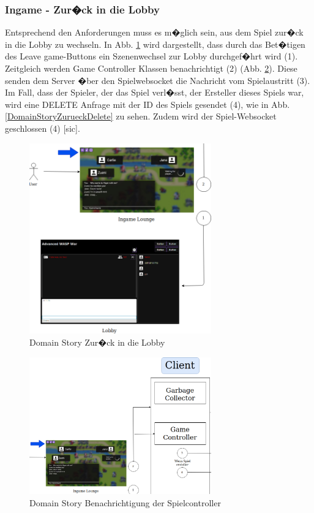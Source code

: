 \documentclass[12pt, titlepage]{scrartcl}
\begin{document}
		\subsubsection{Ingame - Zur�ck in die Lobby}
		Entsprechend den Anforderungen muss es m�glich sein, aus dem Spiel zur�ck in die Lobby zu wechseln. In Abb. \ref{DomainStoryZurueckInDieLobby} wird dargestellt, dass durch das Bet�tigen des Leave game-Buttons ein Szenenwechsel zur Lobby durchgef�hrt wird (1). Zeitgleich werden Game Controller Klassen benachrichtigt (2) (Abb. \ref{DomainStoryZurueckController}). Diese senden dem Server �ber den Spielwebsocket die Nachricht vom Spielaustritt (3). Im Fall, dass der Spieler, der das Spiel verl�sst, der Ersteller dieses Spiels war, wird eine DELETE Anfrage mit der ID des Spiels gesendet (4), wie in Abb. \ref{DomainStoryZurueckDelete} zu sehen. Zudem wird der Spiel-Websocket geschlossen (4) [sic].
		\begin{figure}[H] 
			\centering
			\includegraphics[width=0.7\textwidth]{BackToLobby1.png}
			\caption{Domain Story Zur�ck in die Lobby}
			\label{DomainStoryZurueckInDieLobby}
		\end{figure}
		\begin{figure}[H] 
			\centering
			\includegraphics[width=0.7\textwidth]{BackToLobby2.png}
			\caption{Domain Story Benachrichtigung der Spielcontroller}
			\label{DomainStoryZurueckController}
		\end{figure} 
\end{document}
